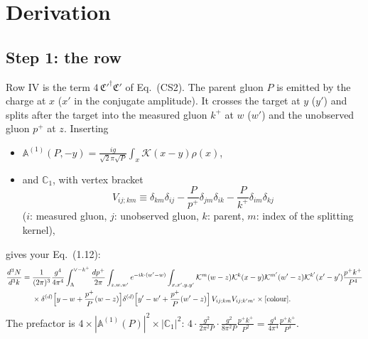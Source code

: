 \documentclass[10pt]{article}
\numberwithin{equation}{section}
\def\mf#1{\mathbb{#1}}
\newcommand{\KK}{\mathcal K}
\begin{document}
\section{Derivation}\label{sec:derivation}
\subsection{Step 1: the row}
Row IV is the term $4\,\mathfrak C'^\dagger\mathfrak C'$ of Eq.~(CS2). The parent gluon $P$ is emitted by the charge at $x$ ($x'$ in the conjugate amplitude). It crosses the target at $y$ ($y'$) and splits after the target into the measured gluon $k^+$ at $w$ ($w'$) and the unobserved gluon $p^+$ at $z$. Inserting
\begin{itemize}
\item $\mf A^{(1)}(P,-y)=\frac{ig}{\sqrt2\pi\sqrt P}\int_x\KK(x-y)\rho(x)$,
\item and $\mf C_1$, with vertex bracket
\begin{equation}
V_{ij;km}\equiv\delta_{km}\delta_{ij}-\frac{P}{p^+}\delta_{jm}\delta_{ik}-\frac{P}{k^+}\delta_{im}\delta_{kj}
\end{equation}
($i$: measured gluon, $j$: unobserved gluon, $k$: parent, $m$: index of the splitting kernel),
\end{itemize}
gives your Eq.~(1.12):
\begin{align}
\frac{d^3N}{d^3k}={}&\frac{1}{(2\pi)^3}\frac{g^4}{4\pi^4}\int_\Lambda^{\vee-k^+}\frac{dp^+}{2\pi}\int_{z,w,w'}e^{-ik\cdot(w'-w)}\int_{x,x',y,y'}\KK^m(w-z)\KK^k(x-y)\KK^{m'}(w'-z)\KK^{k'}(x'-y')\frac{p^+k^+}{P^4}\notag\\
&\times\delta^{(d)}\Big[y-w+\frac{p^+}{P}(w-z)\Big]\delta^{(d)}\Big[y'-w'+\frac{p^+}{P}(w'-z)\Big]\,V_{ij;km}V_{ij;k'm'}\times[\text{colour}].
\label{eq:start}
\end{align}
The prefactor is $4\times|\mf A^{(1)}(P)|^2\times|\mf C_1|^2$: $4\cdot\frac{g^2}{2\pi^2P}\cdot\frac{g^2}{8\pi^2P}\frac{p^+k^+}{P^2}=\frac{g^4}{4\pi^4}\frac{p^+k^+}{P^4}$.
\end{document}
